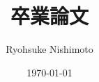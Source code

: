 \documentclass[a4j,11pt,titlepage]{jsbook}
\title{卒業論文}
\author{Ryohsuke Nishimoto}
\date{\today}
\begin{document}
\begin{comment}
\maketitle
\pagenumbering{roman}
\setcounter{tocdepth}{3}
\tableofcontents

\clearpage
\pagenumbering{arabic}

\chapter*{概要}
	卒業論文
\end{comment}

%
	


%

%

%
		


%
%
%
%
%
%
%
\end{document}
